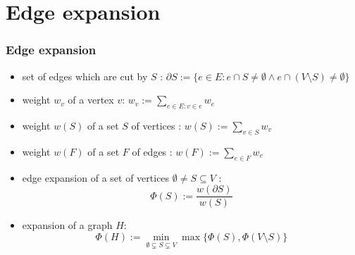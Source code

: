 \documentclass{beamer}
\begin{document}
	\section{Edge expansion}
	\begin{frame}
		\frametitle{Edge expansion}
		\begin{itemize}
			
			\item 
			 set of edges which are cut by  $S$ : $
			\partial S:= \{e\in E : e \cap S \neq \emptyset \land  e \cap (V \setminus S) \neq \emptyset  \}
			$
			\item weight $w_v$ of a vertex $v$: $
			w_v := \sum_{e\in E: v\in e} w_e
		$ %
			\item  weight $w(S)$ of a set $S$ of vertices : 
			$
			w(S) := \sum_{v\in S} w_v
			$
			\item weight $w(F)$ of a set $F$ of edges : 
		$
			w(F) := \sum_{e\in F} w_e
		$
			\item
			 edge expansion of a set of vertices $\emptyset \neq S \subseteq V$ : \begin{equation}
			\Phi(S):= \frac{w(\partial S)}{w(S)}
			\end{equation}
			\item  expansion of a graph $H$: \begin{equation}
			\Phi(H) := \min_{\emptyset \subsetneq S \subsetneq V} \max \{\Phi(S), \Phi(V\setminus S)\}
			\end{equation} 
		\end{itemize}
	\end{frame}
\end{document}
